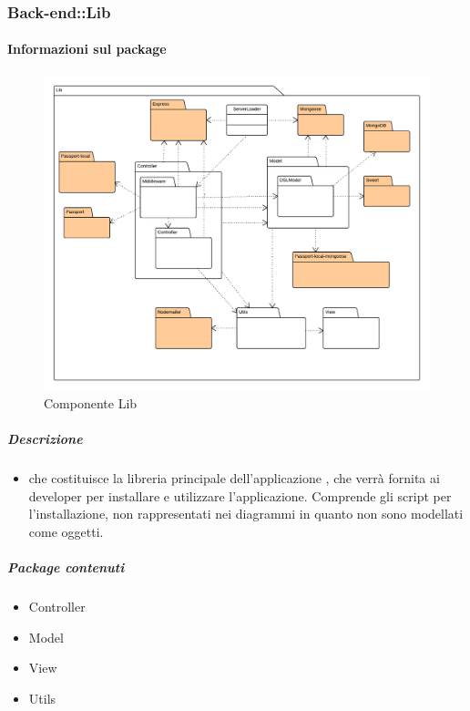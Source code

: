 	\subsubsection{Back-end::Lib}
	\paragraph{Informazioni sul package} 
		\begin{figure}[H] 
			\begin{center} 
				\includegraphics[width=\textwidth]{uml/package/Back-end::Lib.png}  
				\caption{Componente Lib}
			\end{center}  
		\end{figure} 
	\subparagraph{Descrizione} 
		\begin{itemize}
		\item[]  che costituisce la libreria principale dell’applicazione , che verrà fornita ai
developer per installare e utilizzare l’applicazione. Comprende gli script per l’installazione,
non rappresentati nei diagrammi in quanto non sono modellati come oggetti.

		\end{itemize} 
		\subparagraph{Package contenuti} 
		\begin{itemize}
				\item Controller
				\item Model
				\item View
				\item Utils
		\end{itemize}
